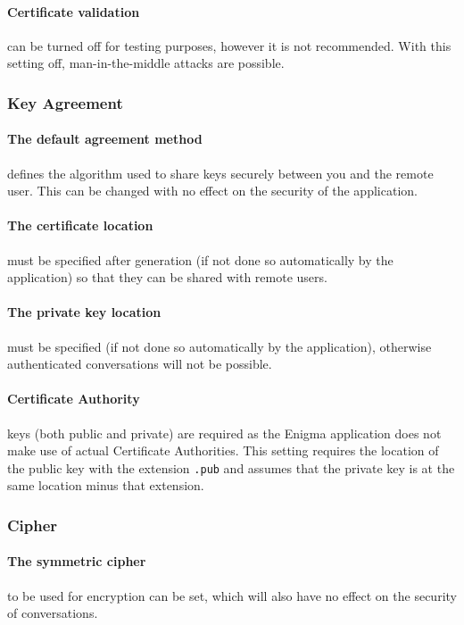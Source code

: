     \paragraph{Certificate validation} can be turned off for testing purposes, however it is not recommended. With this setting off, man-in-the-middle attacks are possible.
  
  \subsubsection{Key Agreement}
  
    \paragraph{The default agreement method} defines the algorithm used to share keys securely between you and the remote user. This can be changed with no effect on the security of the application.
    
    \paragraph{The certificate location} must be specified after generation (if not done so automatically by the application) so that they can be shared with remote users.
    
    \paragraph{The private key location} must be specified (if not done so automatically by the application), otherwise authenticated conversations will not be possible.
    
    \paragraph{Certificate Authority} keys (both public and private) are required as the Enigma application does not make use of actual Certificate Authorities. This setting requires the location of the public key with the extension \verb!.pub! and assumes that the private key is at the same location minus that extension.
  
  \subsubsection{Cipher}
  
    \paragraph{The symmetric cipher} to be used for encryption can be set, which will also have no effect on the security of conversations.

